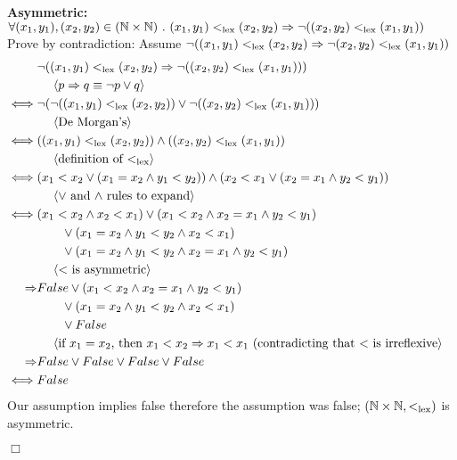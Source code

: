 \documentclass[11pt,fleqn]{article}
\newcommand{\sglsp}{\ }
\newenvironment{proof}{\par\noindent{\bf Proof\sglsp}}{\hfill$\Box$}
\newcommand{\pnote}[1]{{\langle \text{#1} \rangle}}
\begin{document}
\begin{proof}
	\textbf{Asymmetric:} $\forall (x_1,y_1),(x_2,y_2) \in (\mathbb{N} \times \mathbb{N}) ~.~ (x_1,y_1) <_{\rm lex} (x_2,y_2) \Rightarrow \neg{((x_2,y_2) <_{\rm lex} (x_1,y_1))}$\\
	Prove by contradiction: Assume $\neg{((x_1,y_1) <_{\rm lex} (x_2,y_2) \Rightarrow \neg{(x_2,y_2) <_{\rm lex} (x_1,y_1)})}$\\
	\begin{align*}
		& \neg{((x_1,y_1) <_{\rm lex} (x_2,y_2) \Rightarrow \neg{((x_2,y_2) <_{\rm lex} (x_1,y_1))})} & \\
		& ~~~~\pnote{$p\Rightarrow q \equiv \neg{p}\vee q$}\\
		\iff & \neg{(\neg{((x_1,y_1) <_{\rm lex} (x_2,y_2))} \vee \neg{((x_2,y_2) <_{\rm lex} (x_1,y_1))})} & \\
		& ~~~~\pnote{De Morgan's}\\
		\iff & ((x_1,y_1) <_{\rm lex} (x_2,y_2)) \wedge ((x_2,y_2) <_{\rm lex} (x_1,y_1)) & \\
		& ~~~~\pnote{definition of $<_{\rm lex}$}\\
		\iff & (x_1 < x_2 \vee (x_1=x_2 \wedge y_1 < y_2)) \wedge (x_2 < x_1 \vee (x_2=x_1 \wedge y_2 < y_1)) & \\
		& ~~~~\pnote{$\vee$ and $\wedge$ rules to expand}\\
		\iff & (x_1 < x_2 \wedge x_2 < x_1) \vee (x_1 < x_2 \wedge x_2=x_1 \wedge y_2 < y_1) & \\
		& ~~~~~~\vee (x_1=x_2 \wedge y_1 < y_2 \wedge x_2 < x_1) & \\
		& ~~~~~~\vee (x_1=x_2 \wedge y_1 < y_2 \wedge x_2=x_1 \wedge y_2 < y_1) & \\
		& ~~~~\pnote{$<$ is asymmetric}\\
		\Rightarrow & False \vee (x_1 < x_2 \wedge x_2=x_1 \wedge y_2 < y_1) & \\
		& ~~~~~~\vee (x_1=x_2 \wedge y_1 < y_2 \wedge x_2 < x_1) & \\
		& ~~~~~~\vee False & \\
		& ~~~~\pnote{if $x_1 = x_2$, then $x_1 < x_2 \Rightarrow x_1 < x_1$ (contradicting that $<$ is irreflexive}\\
		\Rightarrow & False \vee False \vee False \vee False & \\
		\iff & False
	\end{align*}
	Our assumption implies false therefore the assumption was false; $(\mathbb{N} \times \mathbb{N},<_{\rm lex})$ is asymmetric.
	\medskip
	

\end{proof}
\end{document}
